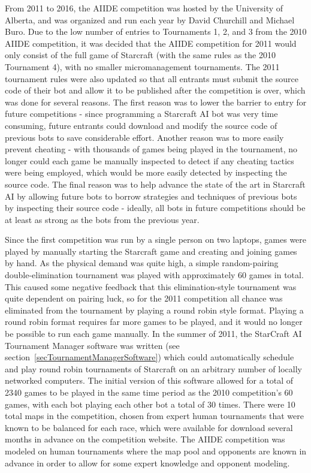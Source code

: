 From 2011 to 2016, the AIIDE competition was hosted by the University of Alberta, and was organized and run each year by David Churchill and Michael Buro. Due to the low number of entries to Tournaments 1, 2, and 3 from the 2010 AIIDE competition, it was decided that the AIIDE competition for 2011 would only consist of the full game of Starcraft (with the same rules as the 2010 Tournament 4), with no smaller micromanagement tournaments. The 2011 tournament rules were also updated so that all entrants must submit the source code of their bot and allow it to be published after the competition is over, which was done for several reasons. The first reason was to lower the barrier to entry for future competitions - since programming a Starcraft AI bot was very time consuming, future entrants could download and modify the source code of previous bots to save considerable effort. Another reason was to more easily prevent cheating - with thousands of games being played in the tournament, no longer could each game be manually inspected to detect if any cheating tactics were being employed, which would be more easily detected by inspecting the source code. The final reason was to help advance the state of the art in Starcraft AI by allowing future bots to borrow strategies and techniques of previous bots by inspecting their source code - ideally, all bots in future competitions should be at least as strong as the bots from the previous year. 

Since the first competition was run by a single person on two laptops, games were played by manually starting the Starcraft game and creating and joining games by hand. As the physical demand was quite high, a simple random-pairing double-elimination tournament was played with approximately 60 games in total. This caused some negative feedback that this elimination-style tournament was quite dependent on pairing luck, so for the 2011 competition all chance was eliminated from the tournament by playing a round robin style format. Playing a round robin format requires far more games to be played, and it would no longer be possible to run each game manually. In the summer of 2011, the StarCraft AI Tournament Manager software was written (see section~\ref{secTournamentManagerSoftware}) which could automatically schedule and play round robin tournaments of Starcraft on an arbitrary number of locally networked computers. The initial version of this software allowed for a total of 2340 games to be played in the same time period as the 2010 competition's 60 games, with each bot playing each other bot a total of 30 times. There were 10 total maps in the competition, chosen from expert human tournaments that were known to be balanced for each race, which were available for download several months in advance on the competition website. The AIIDE competition was modeled on human tournaments where the map pool and opponents are known in advance in order to allow for some expert knowledge and opponent modeling. 


